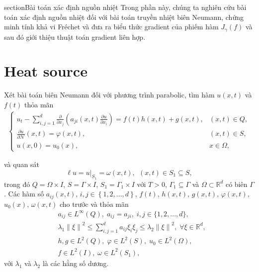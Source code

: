 \documentclass[]{article}
\begin{document}
\newpage
section{Bài toán xác định nguồn nhiệt}
\qquad Trong phần này, chúng ta nghiên cứu bài toán xác định nguồn nhiệt đối với  bài toán truyền nhiệt biên Neumann, chứng minh tính khả vi Fréchet và đưa ra biểu thức gradient của phiếm hàm $J_\gamma(f)$ và sau đó giới thiệu thuật toán gradient liên hợp.

\newpage
\section{Heat source}
\begin{dn}\label{dn3.1}
	Xét bài toán biên Neumann đối với phương trình parabolic, tìm hàm $u(x, t)$ và $f(t)$ thỏa mãn
	\begin{align}\label{3.1}
		\begin{cases}
			u_t-\sum_{i, j=1}^{d}\frac{\partial}{\partial x_j}\left(a_{ji}(x, t)\frac{\partial u}{\partial x_i}\right)=f(t)h(x, t)+g(x, t), & (x, t)\in Q,\\
			\frac{\partial u}{\partial \mathcal{N}}(x, t)=\varphi(x, t), & (x, t)\in S,\\
			u(x, 0)=u_0(x), & x\in \Omega,
		\end{cases}
	\end{align}
\end{dn}
\noindent và quan sát
$$\ell u = u|_{S_1}=\omega(x, t),\,\; (x, t) \in S_1\subseteq S,$$
trong đó $Q = \Omega\times I$, $S=\Gamma\times I$, $S_1=\Gamma_1\times I$ với $T>0$, $\Gamma_1\subseteq \Gamma$ và $\Omega\subset \mathbb{R}^d$ có biên $\Gamma$. Các hàm số $a_{ij}(x, t),\, i, j\in \left\{1, 2, ..., d\right\},\, f(t),\, h(x, t),\, g(x, t), \,\varphi(x, t),$ $ u_0(x),\, \omega(x, t)$ cho trước và thỏa mãn
\begin{align*}
	&a_{ij}\in L^{\infty}(Q), \;a_{ij}=a_{ji},\; i, j\in \{1, 2, ..., d\},\\
	&\lambda_1\left\|\xi\right\|^2\leq \sum_{i, j=1}^{d}a_{ij}\xi_i\xi_j\leq \lambda_2\left\|\xi\right\|^2,\; \forall \xi\in\mathbb{R}^d,\\
	&h, g \in L^2(Q), \; \varphi\in L^2(S), \; u_0\in L^2(\Omega),\\ 
	& f\in L^2(I),\; \omega\in L^2(S_1),
\end{align*}
với $\lambda_1$ và $\lambda_2$ là các hằng số dương.
\end{document}
